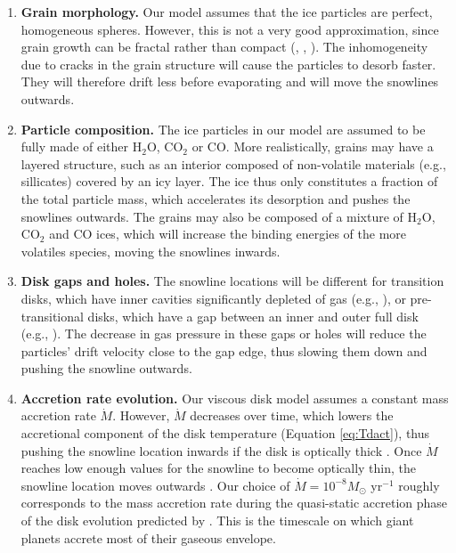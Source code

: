 \documentclass[apj]{emulateapj}
\begin{document}
\begin{enumerate}
\item \textbf{Grain morphology.} Our model assumes that the ice particles are perfect, homogeneous spheres. However, this is not a very good approximation, since grain growth can be fractal rather than compact (\citealt{zsom10}, \citealt{okuzumi12}, \citealt{krijt15}). The inhomogeneity due to cracks in the grain structure will cause the particles to desorb faster. They will therefore drift less before evaporating and will move the snowlines outwards.

\item \textbf{Particle composition.} The ice particles in our model are assumed to be fully made of either H$_2$O, CO$_2$ or CO. More realistically, grains may have a layered structure, such as an interior composed of non-volatile materials (e.g., sillicates) covered by an icy layer. The ice thus only constitutes a fraction of the total particle mass, which accelerates its desorption and pushes the snowlines outwards. The grains may also be composed of a mixture of H$_2$O, CO$_2$ and CO ices, which will increase the binding energies of the more volatiles species, moving %
the snowlines inwards. 


\item \textbf{Disk gaps and holes.} The snowline locations will be different for transition disks, which have inner cavities significantly depleted of gas (e.g., \citealt{espaillat12}), or pre-transitional disks, which have a gap between an inner and outer full disk (e.g., \citealt{kraus11}). The decrease in gas pressure in these gaps or holes will reduce the particles' drift velocity close to the gap edge, thus slowing them down and pushing the snowline outwards.

\item \textbf{Accretion rate evolution.} Our viscous disk model assumes a constant mass accretion rate $\dot{M}$. However, $\dot{M}$ decreases over time, which lowers the accretional component of the disk temperature (Equation \ref{eq:Tdact}), thus pushing the snowline location inwards if the disk is optically thick \citep{garaud07}. Once $\dot{M}$ reaches low enough values for the snowline to become optically thin, the snowline location moves outwards \citep{garaud07}. Our choice of $\dot{M}=10^{-8} M_{\odot}$ yr$^{-1}$ roughly corresponds to the mass accretion rate during the quasi-static accretion phase of the disk evolution predicted by \citet{garaud07}. This is the timescale on which giant planets accrete most of their gaseous envelope.%


\end{enumerate}
\end{document}
